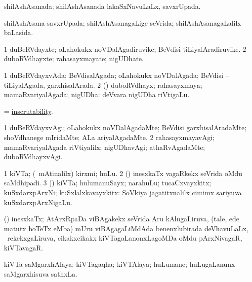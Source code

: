 \bentry
{}
\gl{\gu}
\bmng
shilAshAsanada; shilAshAsanada lakaSxNavuLaLx, savxrUpada. 
\emng
\eentry

\bentry
{}
\gl{\gu}
\bmng
shilAshAsana savxrUpada; shilAshAsanagaLige seVrida; shilAshAsanagaLalilx baLasida. 
\emng
\eentry

\bentry
{}
\gl{\nA}
\bmng
\bnum
\num{1} duBeRVdayxte; oLahokukx noVDalAgadiruvike; BeVdisi tiLiyalAradiruvike. 
\num{2} duboRVdhayxte; rahasayxmayate; nigUDhate. 
\enum
\emng
\eentry

\bentry
{}
\gl{\gu}
\bmng
\bnum
\num{1} duBeRVdayxvAda; BeVdisalAgada; oLahokukx noVDalAgada; BeVdisi -- tiLiyalAgada, garxhisalArada. 
\num{2} (\rUpa) duboRVdhayx; rahasayxmaya; mamaRvariyalAgada; nigUDha:  deVvara nigUDha riVtigaLu. 
\enum
\emng
\eentry

\bentry
{}
\gl{\nA}
\bmng
= \hyperlink{inscrutability}{inscrutability}. 
\emng
\eentry

\bentry
{}
\gl{\kirxvi}
\bmng
\bnum
\num{1} duBeRVdayxvAgi; oLahokukx noVDalAgadaMte; BeVdisi garxhisalAradaMte; shoVdhanege mIridaMte; ALa ariyalAgadaMte. 
\num{2} rahasayxmayavAgi; mamaRvariyalAgada riVtiyalilx; nigUDhavAgi; athaRvAgadaMte; duboRVdhayxvAgi. 
\enum
\emng
\eentry

\bentry
{}
\gl{\nA}
\bmng
\bnum
\num{1} kiVTa; (\sA\ mAtinalilx) kirxmi; huLu. 
\num{2} (\pArxvi) inesxkaTx vagaRkekx seVrida oMdu saMdhipadi. 
\num{3} (\rUpa) kiVTa; hulumanuSayx; narahuLu; tucaCxvayxkitx; kuSxdarxpArxNi; kuSxlalxkavayxkitx:  SoVkiya jagatitxnalilx cimimx sariyuva kuSxdarxpArxNigaLu. 
\enum
\emng
\eentry

\bentry
{}
\gl{\nA}
\bmng
(\pArxvi) inesxkaTx; AtArxRpaDa viBAgakekx seVrida Aru kAlugaLiruva, (tale, ede matutx hoTeTx eMba) mUru viBAgagaLiMdAda benenxlubirada deVhavuLaLx, \sA\ rekekxgaLiruva, cikakxcikakx kiVTagaLanonxLagoMDa oMdu pArxNivagaR, kiVTavagaR. 
\emng
\eentry

\bentry
{}
\gl{\nA}
\bmng
kiVTa saMgarxhAlaya; kiVTagaqha; kiVTAlaya; huLumane; huLugaLanunx saMgarxhisuva sathxLa. 
\emng
\eentry

